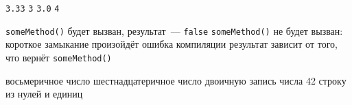 \begin{enumerate}
  {\texttt{3.33}}
  {\texttt{3}}
  {\texttt{3.0}}
  {\texttt{4}}

  {\texttt{someMethod()} будет вызван, результат~--- \texttt{false}}
  {\texttt{someMethod()} не будет вызван: короткое замыкание}
  {произойдёт ошибка компиляции}
  {результат зависит от того, что вернёт \texttt{someMethod()}}

  {восьмеричное число}
  {шестнадцатеричное число}
  {двоичную запись числа 42}
  {строку из нулей и единиц}

\end{enumerate}
